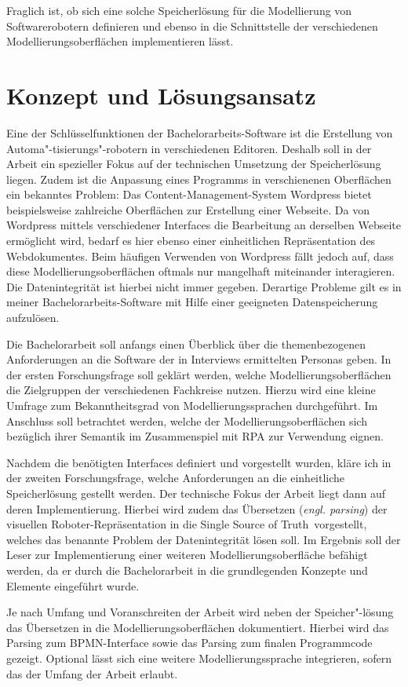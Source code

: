 \documentclass[a4paper, ngerman ]{article}
\newcommand{\ssot}{\glqq Single Source of Truth\grqq}
\begin{document}
Fraglich ist, ob sich eine solche Speicherlösung für die Modellierung von Softwarerobotern definieren und ebenso in die Schnittstelle der verschiedenen Modellierungsoberflächen implementieren lässt.

\section{Konzept und Lösungsansatz}
 
Eine der Schlüsselfunktionen der Bachelorarbeits-Software ist die Erstellung von Automa"-tisierungs"-robotern in verschiedenen Editoren. Deshalb soll in der Arbeit ein spezieller Fokus auf der technischen Umsetzung der Speicherlösung liegen. Zudem ist die Anpassung eines Programms in verschienenen Oberflächen ein bekanntes Problem: Das Content-Management-System
Wordpress bietet beispielsweise zahlreiche Oberflächen zur Erstellung einer Webseite. Da von Wordpress mittels verschiedener Interfaces die Bearbeitung an derselben Webseite ermöglicht wird, bedarf es hier ebenso einer einheitlichen Repräsentation des Webdokumentes. Beim häufigen Verwenden von Wordpress fällt jedoch auf, dass diese Modellierungsoberflächen oftmals nur mangelhaft miteinander interagieren. Die Datenintegrität ist hierbei nicht immer gegeben. Derartige Probleme gilt es in meiner Bachelorarbeits-Software mit Hilfe einer geeigneten Datenspeicherung aufzulösen.

Die Bachelorarbeit soll anfangs einen Überblick über die themenbezogenen Anforderungen an die Software der in Interviews ermittelten Personas geben. In der ersten Forschungsfrage soll geklärt werden, welche Modellierungsoberflächen die Zielgruppen der verschiedenen Fachkreise nutzen. Hierzu wird eine kleine Umfrage zum Bekanntheitsgrad von Modellierungssprachen durchgeführt. Im Anschluss soll betrachtet werden, welche der Modellierungsoberflächen sich bezüglich ihrer Semantik im Zusammenspiel mit RPA zur Verwendung eignen.

Nachdem die benötigten Interfaces definiert und vorgestellt wurden, kläre ich in der zweiten Forschungsfrage, welche Anforderungen an die einheitliche Speicherlösung gestellt werden. Der technische Fokus der Arbeit liegt dann auf deren Implementierung. Hierbei wird zudem das Übersetzen (\textit{engl. parsing}) der visuellen Roboter-Repräsentation in die \ssot ~vorgestellt, welches das benannte Problem der Datenintegrität lösen soll. Im Ergebnis soll der Leser zur Implementierung einer weiteren Modellierungsoberfläche befähigt werden, da er durch die Bachelorarbeit in die grundlegenden Konzepte und Elemente eingeführt wurde.

Je nach Umfang und Voranschreiten der Arbeit wird neben der Speicher"-lösung das Übersetzen in die Modellierungsoberflächen dokumentiert. Hierbei wird das Parsing zum BPMN-Interface sowie das Parsing zum finalen Programmcode gezeigt. Optional lässt sich  eine weitere Modellierungssprache integrieren, sofern das der Umfang der Arbeit erlaubt.
\end{document}
